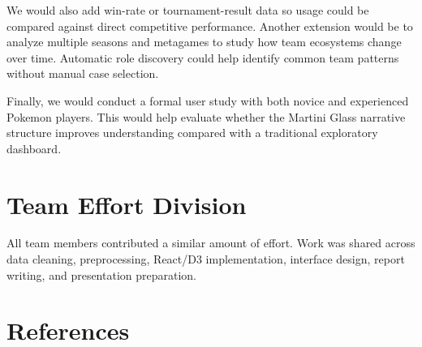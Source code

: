 \documentclass[11pt]{article}
\newcommand{\tightsection}[1]{\vspace{-0.25em}\section{#1}\vspace{-0.25em}}
\begin{document}
We would also add win-rate or tournament-result data so usage could be compared against direct competitive performance. Another extension would be to analyze multiple seasons and metagames to study how team ecosystems change over time. Automatic role discovery could help identify common team patterns without manual case selection.

Finally, we would conduct a formal user study with both novice and experienced Pokemon players. This would help evaluate whether the Martini Glass narrative structure improves understanding compared with a traditional exploratory dashboard.

\tightsection{Team Effort Division}
All team members contributed a similar amount of effort. Work was shared across data cleaning, preprocessing, React/D3 implementation, interface design, report writing, and presentation preparation.

\clearpage
\tightsection{References}
\vspace{-0.75em}
\renewcommand{\refname}{}


\end{document}
